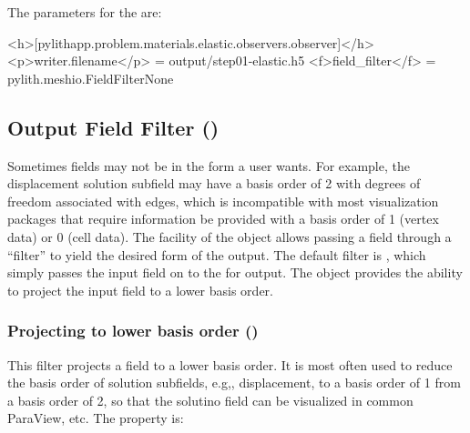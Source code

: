 The parameters for the  are:
\begin{inventory}

\begin{cfg}
<h>[pylithapp.problem.materials.elastic.observers.observer]</h>
<p>writer.filename</p> = output/step01-elastic.h5
<f>field_filter</f> = pylith.meshio.FieldFilterNone
\end{cfg}

\subsection{Output Field Filter ()}

Sometimes fields may not be in the form a user wants. For example, the
displacement solution subfield may have a basis order of 2 with
degrees of freedom associated with edges, which is incompatible with
most visualization packages that require information be provided with
a basis order of 1 (vertex data) or 0 (cell data). The
 facility of the  object
allows passing a field through a ``filter'' to yield the desired form
of the output. The default filter is , which
simply passes the input field on to the  for
output. The  object provides the ability to
project the input field to a lower basis order.

\subsubsection{Projecting to lower basis order ()}

This filter projects a field to a lower basis order. It is most often
used to reduce the basis order of solution subfields, e.g,,
displacement, to a basis order of 1 from a basis order of 2, so that
the solutino field can be visualized in common ParaView, etc.
The  property is:
\begin{inventory}
\end{inventory}


\end{inventory}
